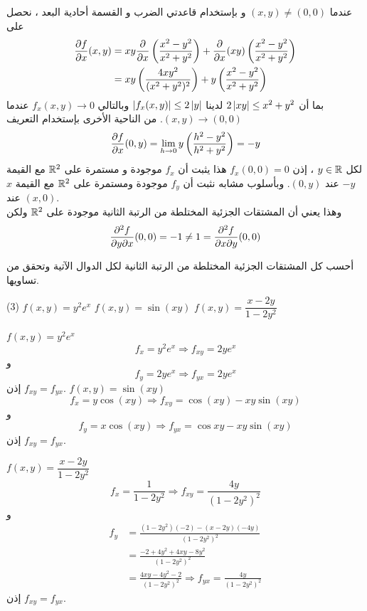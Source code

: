 \begin{myproof}
    عندما $(x,y)\neq(0,0)$ و بإستخدام قاعدتي الضرب و القسمة أحادية البعد ، نحصل على
    \begin{align*}
        \dfrac{\partial f}{\partial x}(x,y)&=xy\dfrac{\partial}{\partial x}\left(\frac{x^2-y^2}{x^2+y^2}\right)+\dfrac{\partial}{\partial x}(xy)\left(\frac{x^2-y^2}{x^2+y^2}\right)\\
        &=xy\left(\frac{4xy^2}{(x^2+y^2)^2}\right)+y\left(\frac{x^2-y^2}{x^2+y^2}\right)
    \end{align*}
    بما أن $2\left|xy\right|\leq x^2+y^2$ لدينا $\left|f_x(x,y)\right|\leq 2\left|y\right|$ وبالتالي $f_x(x,y)\to0$ عندما $(x,y)\to(0,0)$. من الناحية الأخرى بإستخدام التعريف
    \[
    \dfrac{\partial f}{\partial x}(0,y)=\lim\limits_{h\to0}y\left(\frac{h^2-y^2}{h^2+y^2}\right)=-y
    \]
    لكل $y\in\mathbb{R}$ ، إذن $f_x(0,0)=0$ هذا يثبت أن $f_x$ موجودة و مستمرة على $\mathbb{R}^2$ مع القيمة $-y$ عند $(0,y)$. وبأسلوب مشابه نثبت أن $f_y$ موجودة ومستمرة على $\mathbb{R}^2$ مع القيمة $x$ عند $(x,0)$.\\
    وهذا يعني أن المشتقات الجزئية المختلطة من الرتبة الثانية موجودة على $\mathbb{R}^2$ ولكن
    \[
    \dfrac{\partial^2f}{\partial y\partial x}(0,0)=-1\neq 1=\dfrac{\partial^2f}{\partial x\partial y}(0,0)
    \]
\end{myproof}

\begin{example}
أحسب كل المشتقات الجزئية المختلطة من الرتبة الثانية لكل الدوال الآتية وتحقق من تساويها.
\begin{tasks}[label=\arabic*),label-width=14pt](3)
    \task $f(x,y)=y^2e^x$
    \task $f(x,y)=\sin(xy)$
    \task $f(x,y)=\dfrac{x-2y}{1-2y^2}$
\end{tasks}
\end{example}

\begin{solution}
    \begin{tasks}[label=\arabic*),label-width=14pt]
    \task $f(x,y)=y^2e^x$
    \[
    f_x=y^2e^x\Rightarrow f_{xy}=2ye^x
    \]
    و
\[
f_y=2ye^x\Rightarrow f_{yx}=2ye^x
\]
إذن $f_{xy}=f_{yx}$.
    \task $f(x,y)=\sin(xy)$
    \[
    f_x=y\cos{(xy)}\Rightarrow f_{xy}=\cos{(xy)}-xy\sin{(xy)}
    \]
و
\[
f_y=x\cos{(xy)}\Rightarrow f_{yx}=\cos{xy}-xy\sin{(xy)}
\]
إذن $f_{xy}=f_{yx}$. 

    \task $f(x,y)=\dfrac{x-2y}{1-2y^2}$
\[
f_x=\frac{1}{1-2y^2}\Rightarrow f_{xy}=\frac{4y}{(1-2y^2)^2}
\]
و
\begin{align*}
f_y&=\frac{(1-2y^2)(-2)-(x-2y)(-4y)}{(1-2y^2)^2}\\[7pt]
&=\frac{-2+4y^2+4xy-8y^2}{(1-2y^2)^2}\\[7pt]
&=\frac{4xy-4y^2-2}{(1-2y^2)^2} \Rightarrow f_{yx}=\frac{4y}{(1-2y^2)^2}
\end{align*}
إذن $f_{xy}=f_{yx}$.
    \end{tasks}
\end{solution}

